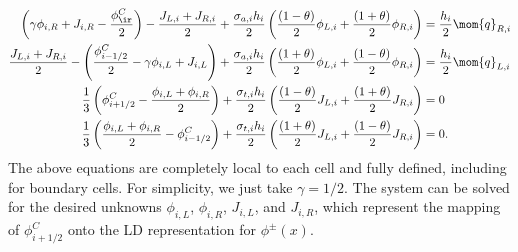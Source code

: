 \begin{align}\label{eq:update1}
    \left(\gamma\phi_{i,R} + J_{i,R} - \frac{\phi_{\ir}^C}{2} \right) - \frac{J_{L,i} + J_{R,i}}{2} + \frac{\sigma_{a,i} h_i}{2} \left(
    \frac{(1-\theta)}{2} \phi_{L,i} +
    \frac{(1+\theta)}{2}\phi_{R,i}\right) &= \frac{h_i}{2} \mom{q}_{R,i} \\
    \frac{J_{L,i} + J_{R,i}}{2} -\left(\frac{\phi_{i-1/2}^C}{2} - \gamma \phi_{i,L} +
    J_{i,L}\right) + \frac{\sigma_{a,i} h_i}{2} \left(
    \frac{(1+\theta)}{2} \phi_{L,i} +
    \frac{(1-\theta)}{2}\phi_{R,i}\right) &= \frac{h_i}{2} \mom{q}_{L,i} 
    \\
    \frac{1}{3}\left(\phi_{i+1/2}^C - \frac{\phi_{i,L} + \phi_{i,R}}{2}\right) +
    \frac{\sigma_{t,i} h_i}{2}\left( \frac{(1-\theta)}{2} J_{L,i} +
    \frac{(1+\theta)}{2}J_{R,i}\right)    &= 0 \\
    \frac{1}{3}\left(\frac{\phi_{i,L} + \phi_{i,R}}{2} - \phi^C_{i-1/2} \right) +
    \frac{\sigma_{t,i} h_i}{2} \left( \frac{(1+\theta)}{2} J_{L,i} +
    \frac{(1-\theta)}{2}J_{R,i}\right) &= 0 . \label{eq:update2}
\end{align}
The above equations are completely local to each cell and fully defined, including for
boundary cells. For simplicity, we just take $\gamma=1/2$.  The system can be solved for the desired unknowns
$\phi_{i,L}$, $\phi_{i,R}$, $J_{i,L}$, and $J_{i,R}$, which represent the mapping of
$\phi_{i+1/2}^C$ onto the LD representation for $\phi^{\pm}(x)$.
